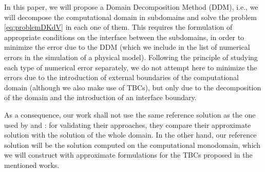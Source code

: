 \indent In this paper, we will propose a Domain Decomposition Method (DDM), i.e., we will decompose the computational domain in subdomains and solve the problem \eqref{eq:problemDKdV} in each one of them. This requires the formulation of appropriate conditions on the interface between the subdomains, in order to minimize the error due to the DDM (which we include in the list of numerical errors in the simulation of a physical model). Following the principle of studying each type of numerical error separately, we do not attempt here to minimize the errors due to the introduction of external boundaries of the computational domain (although we also make use of TBCs), but only due to the decomposition of the domain and the introduction of an interface boundary.

\noindent As a consequence, our work shall not use the same reference solution as the one used by \cite{zheng2008} and \cite{besse2015} : for validating their approaches,  they compare their approximate solution with the solution of the whole domain. In the other hand, our reference solution will be the solution computed on the computational monodomain, which we will construct with approximate formulations for the TBCs proposed in the mentioned works.